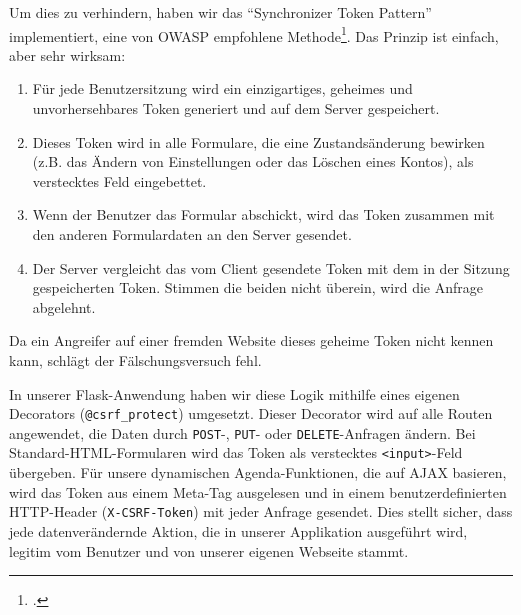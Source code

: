 \documentclass[12pt,a4paper]{report}
\begin{document}
Um dies zu verhindern, haben wir das \enquote{Synchronizer Token Pattern} implementiert, eine von OWASP empfohlene Methode\footcite{OWASP_CSRF}. Das Prinzip ist einfach, aber sehr wirksam:
\begin{enumerate}
    \item Für jede Benutzersitzung wird ein einzigartiges, geheimes und unvorhersehbares Token generiert und auf dem Server gespeichert.
    \item Dieses Token wird in alle Formulare, die eine Zustandsänderung bewirken (z.B. das Ändern von Einstellungen oder das Löschen eines Kontos), als verstecktes Feld eingebettet.
    \item Wenn der Benutzer das Formular abschickt, wird das Token zusammen mit den anderen Formulardaten an den Server gesendet.
    \item Der Server vergleicht das vom Client gesendete Token mit dem in der Sitzung gespeicherten Token. Stimmen die beiden nicht überein, wird die Anfrage abgelehnt.
\end{enumerate}
Da ein Angreifer auf einer fremden Website dieses geheime Token nicht kennen kann, schlägt der Fälschungsversuch fehl.

In unserer Flask-Anwendung haben wir diese Logik mithilfe eines eigenen Decorators (\texttt{@csrf\_protect}) umgesetzt. Dieser Decorator wird auf alle Routen angewendet, die Daten durch \texttt{POST}-, \texttt{PUT}- oder \texttt{DELETE}-Anfragen ändern. Bei Standard-HTML-Formularen wird das Token als verstecktes \texttt{<input>}-Feld übergeben. Für unsere dynamischen Agenda-Funktionen, die auf AJAX basieren, wird das Token aus einem Meta-Tag ausgelesen und in einem benutzerdefinierten HTTP-Header (\texttt{X-CSRF-Token}) mit jeder Anfrage gesendet. Dies stellt sicher, dass jede datenverändernde Aktion, die in unserer Applikation ausgeführt wird, legitim vom Benutzer und von unserer eigenen Webseite stammt.



\clearpage
{} %
\nocite{*}
\printbibliography[title={Literaturverzeichnis}]

\clearpage
{}
\listoffigures
\end{document}
